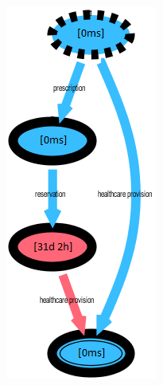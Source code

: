 \begin{figure} [htbp]
\centering
\begin{minipage}[t]{0.3\textwidth}
\centering
\includegraphics[width=\textwidth]{AmbulatorioSojournYoungs}

\end{minipage}
\end{figure}
